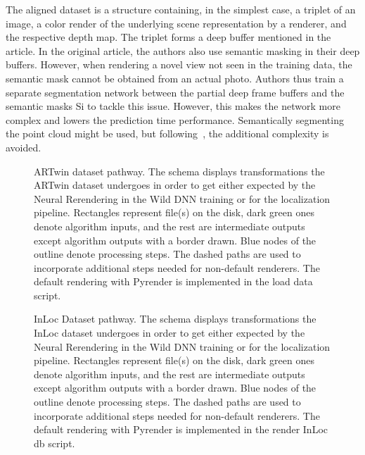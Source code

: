 The aligned dataset is a structure containing, in the simplest case, a triplet of an
image, a color render of the underlying scene representation by a renderer, and the
respective depth map. The triplet forms a deep buffer mentioned in the article.  In the
original article, the authors also use semantic masking in their deep buffers.  However,
when rendering a novel view not seen in the training data, the semantic mask cannot be
obtained from an actual photo. Authors thus train a separate segmentation network between
the partial deep frame buffers and the semantic masks Si to tackle this issue. However,
this makes the network more complex and lowers the prediction time performance.
Semantically segmenting the point cloud might be used, but following~\citet{Bastien}, the
additional complexity is avoided.

\begin{figure}
    \centering
    
    \caption[ARTwin Dataset pathway]{ARTwin dataset pathway. The
    schema displays transformations the ARTwin dataset undergoes in order to get either
     expected by the Neural Rerendering in the Wild DNN training or
     for the localization pipeline. Rectangles represent file(s) on the disk,
    dark green ones denote algorithm inputs, and the rest are intermediate outputs except
    algorithm outputs with a border drawn. Blue nodes of the outline denote processing
    steps. The dashed paths are used to incorporate additional steps needed for
    non-default renderers.  The default rendering with Pyrender is implemented in the load
    data script.}
    \label{fig:artwin_dset_pathway}
\end{figure}

\begin{figure}
    \centering
    
    \caption[InLoc Dataset pathway]{InLoc Dataset pathway. The
    schema displays transformations the InLoc dataset undergoes in order to get either
     expected by the Neural Rerendering in the Wild DNN training or
     for the localization pipeline. Rectangles represent file(s) on the disk,
    dark green ones denote algorithm inputs, and the rest are intermediate outputs except
    algorithm outputs with a border drawn. Blue nodes of the outline denote processing
    steps. The dashed paths are used to incorporate additional steps needed for
    non-default renderers.  The default rendering with Pyrender is implemented in the
    render InLoc db script.}
    \label{fig:inloc_dset_pathway}
\end{figure}

